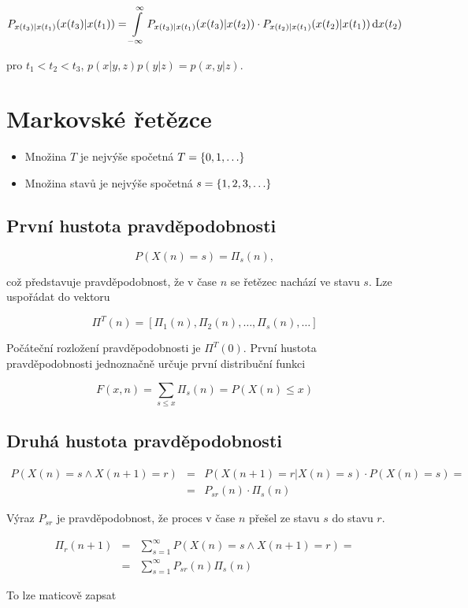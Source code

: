 \[ P_{x(t_3)|x(t_1)}(x(t_3)|x(t_1))=\int\limits_{-\infty}^\infty P_{x(t_3)|x(t_1)}(x(t_3)|x(t_2))\cdot P_{x(t_2)|x(t_1)}(x(t_2)|x(t_1))\,\mathrm{d} x(t_2) \]

pro $t_1<t_2<t_3$, $p(x|y, z)p(y|z)=p(x,y|z)$.

\section{Markovské řetězce}
\begin{itemize}[noitemsep]
\item Množina $T$ je nejvýše spočetná $T=\left\{0,1,\ldots\right\}$
\item Množina stavů je nejvýše spočetná $s=\left\{1,2,3,\ldots\right\}$
\end{itemize}

\subsection{První hustota pravděpodobnosti}

\[ P(X(n)=s)=\Pi_s(n), \]

což představuje pravděpodobnost, že v čase $n$ se řetězec nachází ve stavu $s$. Lze uspořádat do vektoru

\[ \Pi^T(n) = [\Pi_1(n),\Pi_2(n),\ldots,\Pi_s(n),\ldots] \]

Počáteční rozložení pravděpodobnosti je $\Pi^T(0)$. První hustota pravděpodobnosti jednoznačně určuje první distribuční funkci

\[ F(x,n)=\sum_{s\leq x} \Pi_s(n)=P(X(n)\leq x) \]

\subsection{Druhá hustota pravděpodobnosti}
\begin{eqnarray*}
P(X(n)=s\wedge X(n+1)=r) & = & P(X(n+1)=r|X(n)=s)\cdot P(X(n)=s) =\\
& = & P_{sr}(n)\cdot\Pi_s(n)
\end{eqnarray*}

Výraz $P_{sr}$ je pravděpodobnost, že proces v čase $n$ přešel ze stavu $s$ do stavu $r$.

\begin{eqnarray*}
\Pi_r(n+1) & = & \sum_{s=1}^\infty P(X(n)=s\wedge X(n+1)=r) =\\
& = & \sum_{s=1}^\infty P_{sr}(n)\Pi_s(n)
\end{eqnarray*}

To lze maticově zapsat

